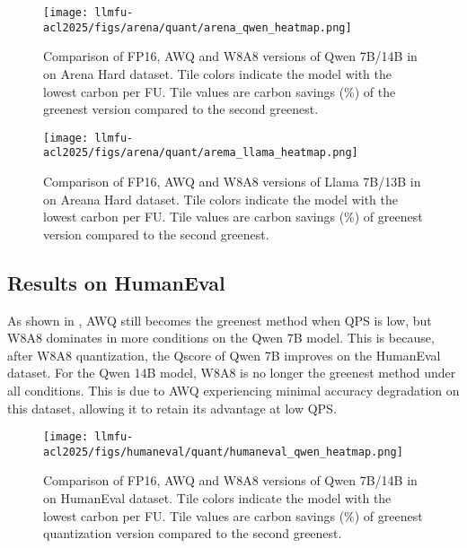 \begin{figure}[!t]
    \centering
    \texttt{[image: llmfu-acl2025/figs/arena/quant/arena\_qwen\_heatmap.png]}
    \vspace{-0.2in}
    \caption{Comparison of FP16, AWQ and W8A8 versions of Qwen 7B/14B in \SYSTEM{} on Arena Hard dataset. Tile colors indicate the model with the lowest carbon per FU. Tile values are carbon savings (\%) of the greenest version compared to the second greenest.}
    \label{fig:arena_quant_heat_w8a8_qwen}
\end{figure}



\begin{figure}[!t]
    \centering
    \texttt{[image: llmfu-acl2025/figs/arena/quant/arema\_llama\_heatmap.png]}
    \vspace{-0.2in}
    \caption{Comparison of FP16, AWQ and W8A8 versions of Llama 7B/13B in \SYSTEM{} on Areana Hard dataset. Tile colors indicate the model with the lowest carbon per FU. Tile values are carbon savings (\%) of greenest version compared to the second greenest.}
    \label{fig:arena_quant_heat_w8a8_llama}
\end{figure}


\subsection{Results on HumanEval}
As shown in , AWQ still becomes the greenest method when QPS is low, but W8A8 dominates in more conditions on the Qwen 7B model. This is because, after W8A8 quantization, the Qscore of Qwen 7B improves on the HumanEval dataset. For the Qwen 14B model, W8A8 is no longer the greenest method under all conditions. This is due to AWQ experiencing minimal accuracy degradation on this dataset, allowing it to retain its advantage at low QPS.


\begin{figure}[!t]
    \centering
    \texttt{[image: llmfu-acl2025/figs/humaneval/quant/humaneval\_qwen\_heatmap.png]}
    \vspace{-0.2in}
    \caption{Comparison of FP16, AWQ and W8A8 versions of Qwen 7B/14B in \SYSTEM{} on HumanEval dataset. Tile colors indicate the model with the lowest carbon per FU. Tile values are carbon savings (\%) of greenest quantization version compared to the second greenest.}
    \label{fig:humaneval_quant_heat_w8a8_qwen}
\end{figure}

